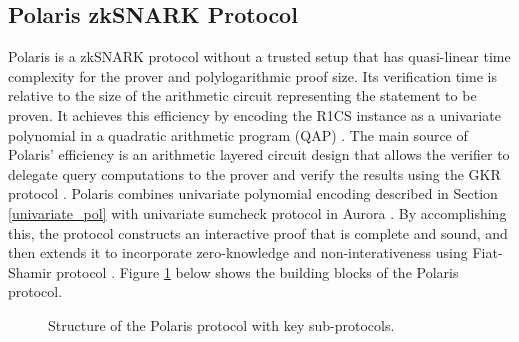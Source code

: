 \subsection{Polaris zkSNARK Protocol}


Polaris \cite{Polaris} is a zkSNARK protocol without a trusted setup that has quasi-linear time complexity for the prover and polylogarithmic proof size. Its verification time is relative to the size of the arithmetic circuit representing the statement to be proven. It achieves this efficiency by encoding the R1CS instance as a univariate polynomial in a quadratic arithmetic program (QAP) \cite{gennaro2013quadratic}. The main source of Polaris' efficiency is an arithmetic layered circuit design that allows the verifier to delegate query computations to the prover and verify the results using the GKR protocol \cite{GKR2008}. 
Polaris combines univariate polynomial encoding described in Section \ref{univariate_pol} with univariate sumcheck protocol in Aurora \cite{aurora}.
By accomplishing this, the protocol constructs an interactive proof that is complete and sound, and then extends it to incorporate zero-knowledge and non-interativeness using Fiat-Shamir protocol \cite{fiat1986prove}. Figure \ref{fig:polaris-blocks} below shows the building blocks of the Polaris protocol.

\begin{figure}[h]
	\centering
	
	\caption{
		Structure of the Polaris protocol with key sub-protocols. }
	\label{fig:polaris-blocks}
\end{figure}



